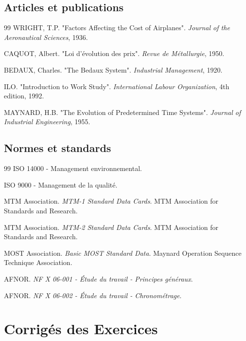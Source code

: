 \documentclass[a4paper,12pt]{article}
\begin{document}
\subsection{Articles et publications}

\begin{thebibliography}{99}
     WRIGHT, T.P. "Factors Affecting the Cost of Airplanes". \textit{Journal of the Aeronautical Sciences}, 1936.
    
     CAQUOT, Albert. "Loi d'évolution des prix". \textit{Revue de Métallurgie}, 1950.
    
     BEDAUX, Charles. "The Bedaux System". \textit{Industrial Management}, 1920.
    
     ILO. "Introduction to Work Study". \textit{International Labour Organization}, 4th edition, 1992.
    
     MAYNARD, H.B. "The Evolution of Predetermined Time Systems". \textit{Journal of Industrial Engineering}, 1955.
\end{thebibliography}

\subsection{Normes et standards}

\begin{thebibliography}{99}
     ISO 14000 - Management environnemental.
    
     ISO 9000 - Management de la qualité.
    
     MTM Association. \textit{MTM-1 Standard Data Cards}. MTM Association for Standards and Research.
    
     MTM Association. \textit{MTM-2 Standard Data Cards}. MTM Association for Standards and Research.
    
     MOST Association. \textit{Basic MOST Standard Data}. Maynard Operation Sequence Technique Association.
    
     AFNOR. \textit{NF X 06-001 - Étude du travail - Principes généraux}.
    
     AFNOR. \textit{NF X 06-002 - Étude du travail - Chronométrage}.
\end{thebibliography}

\section{Corrigés des Exercices}
\end{document}
